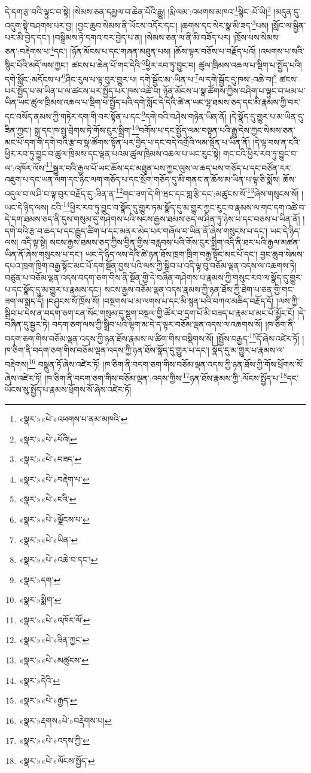 དེ་དག་རྩ་བའི་ལྟུང་བ་སྟེ། །སེམས་ཅན་དམྱལ་བ་ཆེན་པོའི་རྒྱུ། །རྨི་ལམ་:འཕགས་མཁའ་\footnote{«སྣར་»«པེ་»འཕགས་པ་ནམ་མཁའི་}སྙིང་:པོ་ཡི།\footnote{«སྣར་»«པེ་»པོའི།} །མདུན་དུ་འདུག་སྟེ་བཤགས་པར་བྱ། །བྱང་ཆུབ་སེམས་ནི་ཡོངས་འདོར་དང་། །ཆགས་དང་སེར་སྣ་མི་ཟད་\footnote{«སྣར་»«པེ་»བཟད་}པས། །སློང་ལ་སྦྱིན་པར་མི་བྱེད་དང་། །བསྒྲིམས་ཏེ་དགའ་བར་བྱེད་པ་ན། །སེམས་ཅན་ལ་ནི་མི་བཟོད་པར། །ཁྲོས་པས་སེམས་ཅན་:བརྡེགས་པ་\footnote{«སྣར་»«པེ་»བརྡེག་པ་}དང་། །ཉོན་མོངས་པ་དང་གཞན་མཐུན་པས། །ཆོས་ལྟར་བཅོས་པ་བརྗོད་པའོ། །འཕགས་པ་སའི་སྙིང་པོའི་མདོ་ལས་ཀྱང་། ཚངས་པ་ཆེན་པོ་གང་དེའི་\footnote{«སྣར་»«པེ་»ངའི་}ཕྱིར་རབ་ཏུ་བྱུང་བ། ཚུལ་ཁྲིམས་འཆལ་པ་སྡིག་པ་སྤྱོད་པའི། དགེ་སློང་:མདོངས་པ་\footnote{«སྣར་»«པེ་»ལྗོངས་པ་}ཤིང་རུལ་པ་ལྟ་བུར་གྱུར་པ། དགེ་སྦྱོང་མ་:ཡིན་པ་\footnote{«སྣར་»«པེ་»ཡིན་}ལ་དགེ་སྦྱོང་དུ་ཁས་:འཆེ་བ།\footnote{«སྣར་»«པེ་»འཆེ་བ་དང་།} ཚངས་པར་སྤྱོད་པ་མ་ཡིན་པ་ལ་ཚངས་པར་སྤྱོད་པར་ཁས་འཚེ་བ། ཉོན་མོངས་པ་སྣ་ཚོགས་ཀྱིས་བཤིག་པ་ལྟུང་བ་ཕམ་པ་ཡིན་ཡང་ཚུལ་ཁྲིམས་འཆལ་པ་སྡིག་པ་སྤྱོད་པའི་དགེ་སློང་དེ་དེའི་ཚེ་ན་ཡང་ལྷ་ཐམས་ཅད་དང་མི་རྣམས་ཀྱི་བར་དང་བསོད་ནམས་ཀྱི་གཏེར་དག་གི་བར་སྟོན་པ་དང་\footnote{«སྣར་»དག་}དགེ་བའི་བཤེས་གཉེན་ཡིན་ནོ། །དེ་སྣོད་དུ་གྱུར་པ་མ་ཡིན་དུ་ཟིན་ཀྱང་། སྐྲ་དང་ཁ་སྤུ་བྲེགས་ཏེ་གོས་ངུར་སྨྲིག་\footnote{«སྣར་»སྨིག་}བགོས་པ་དང་སྤྱོད་ལམ་བསྟན་པའི་རྒྱུ་དེས་ཀྱང་སེམས་ཅན་མང་པོ་དག་གི་དགེ་བའི་རྩ་བ་སྣ་ཚོགས་སྟོན་པར་བྱེད་པ་དང་བདེ་འགྲོའི་ལམ་སྟོན་པ་ཡིན་ནོ། །དེ་ལྟ་བས་ན་ངའི་ཕྱིར་རབ་ཏུ་བྱུང་བ་ཚུལ་ཁྲིམས་དང་ལྡན་པའམ་ཚུལ་ཁྲིམས་འཆལ་པ་ཡང་རུང་སྟེ། གང་ངའི་ཕྱིར་རབ་ཏུ་བྱུང་བ་ལ་:འཁོར་ལོས་\footnote{«སྣར་»«པེ་»འཁོར་ལོ་}སྒྱུར་བའི་རྒྱལ་པོ་ཡང་ཆོས་དང་མཐུན་པས་ཀྱང་ལུས་ལ་ཆད་པས་གཅོད་པ་དང་བཙོན་རར་འཇུག་པ་དང་ཡན་ལག་དང་ཉིང་ལག་གཅོད་པ་དང་སྲོག་གཅོད་དུ་མི་གནང་ན་ཆོས་མ་ཡིན་པ་ལྟ་ཅི་སྨོས། ཆོས་འདུལ་བ་ལ་ཤི་བ་ལྟ་བུར་བརྗོད་དུ་:ཟིན་ན་\footnote{«སྣར་»«པེ་»ཟིན་ཀྱང་}གང་ཟག་དེ་གི་ཝང་དང་གླ་རྩི་དང་:མཚུངས་སོ་\footnote{«སྣར་»«པེ་»མཚུངས་}ཞེས་གསུངས་སོ། །ཡང་དེ་ཉིད་ལས། ངའི་\footnote{«སྣར་»དེའི་}ཕྱིར་རབ་ཏུ་བྱུང་བ་སྣོད་དུ་གྱུར་ཏམ་སྣོད་དུ་མ་གྱུར་ཀྱང་རུང་བ་རྣམས་ལ་གང་དག་འཚེ་བ་དེ་དག་ཐམས་ཅད་ནི་དུས་གསུམ་དུ་གཤེགས་པའི་སངས་རྒྱས་ཐམས་ཅད་ལ་ཤིན་ཏུ་ཉེས་པ་དང་བཅས་པ་ཡིན་ནོ། །དགེ་བའི་རྩ་བ་ཆད་པ་དང་རྒྱུད་ཚིག་པ་དང་མནར་མེད་པར་གཞོལ་བ་ཡིན་ནོ་ཞེས་གསུངས་པ་དང་། ཡང་དེ་ཉིད་ལས། འདི་ལྟ་སྟེ། སངས་རྒྱས་ཐམས་ཅད་ཀྱིས་བྱིན་གྱིས་བརླབས་པའི་གོས་ངུར་སྨྲིག་འདི་ནི་ཐར་པའི་རྒྱལ་མཚན་ཡིན་ནོ་ཞེས་གསུངས་པ་དང་། ཡང་དེ་ཉིད་ལས་དེའི་ཚེ་ཉན་ཐོས་ཁྲག་ཁྲིག་བརྒྱ་སྟོང་མང་པོ་དང་། བྱང་ཆུབ་སེམས་དཔའ་ཁྲག་ཁྲིག་བརྒྱ་སྟོང་མང་པོ་དག་སྔོན་བྱས་པའི་ལས་ཀྱི་སྒྲིབ་པ་འདི་ལྟ་བུ་བཅོམ་ལྡན་འདས་ལ་འཆགས་ཏེ། བཙུན་པ་བཅོམ་ལྡན་འདས་བདག་ཅག་གིས་ནི་སྔོན་གྱི་དེ་བཞིན་གཤེགས་པ་རྣམས་ཀྱི་གསུང་རབ་ལ་སྣོད་དུ་གྱུར་པ་དང་སྣོད་དུ་མ་གྱུར་པ་རྣམས་དང་། སངས་རྒྱས་བཅོམ་ལྡན་འདས་རྣམས་ཀྱི་ཉན་ཐོས་ཀྱི་ཐེག་པ་ཅན་གྱི་གང་ཟག་ལ་སྨད་དོ། །བཤུངས་སོ་ཁྲོས་སོ། །བསྔགས་པ་མ་ལགས་པ་དང་མི་སྙན་པའི་བཀའ་མཆིད་བརྗོད་དོ། །ལས་ཀྱི་སྒྲིབ་པ་དེས་ན་བདག་ཅག་ངན་སོང་གསུམ་དུ་སྡུག་བསྔལ་གྱི་ཚོར་བ་དྲག་པོ་མི་བཟད་པ་རྣམ་པ་མང་པོ་མྱོང་ངོ། །དེ་བཞིན་དུ་སྦྱར་ཏེ། བདག་ཅག་ལས་ཀྱི་སྒྲིབ་པའི་ལྷག་མ་དེ་ད་ལྟར་བཅོམ་ལྡན་འདས་ལ་འཆགས་སོ། །ཁ་ཅིག་ནི་བདག་ཅག་གིས་བཅོམ་ལྡན་འདས་ཀྱི་ཉན་ཐོས་རྣམས་ལ་ཚིག་གིས་བསྡིགས་སོ། །སྤྱོས་བརྒྱད་\footnote{«སྣར་»«པེ་»རྒྱད་}དོ་ཞེས་འཛེར་ཏོ། །ཁ་ཅིག་ནི་བདག་ཅག་གིས་བཅོམ་ལྡན་འདས་ཀྱི་ཉན་ཐོས་སྣོད་དུ་གྱུར་པ་དང་། སྣོད་དུ་མ་གྱུར་པ་རྣམས་ལ་བརྡེགས།\footnote{«སྣར་»རྡགས«པེ་»བརྡེགས་པ།} བསྣུན་ཏོ་ཞེས་འཛེར་ཏོ། །ཁ་ཅིག་ནི་བདག་ཅག་གིས་བཅོམ་ལྡན་འདས་ཀྱི་ཉན་ཐོས་ཀྱི་གོས་ཕྲོགས་སོ་ཞེས་འཛེར་ཏོ། །ཁ་ཅིག་ནི་བདག་ཅག་གིས་བཅོམ་ལྡན་:འདས་ཀྱིས་\footnote{«སྣར་»«པེ་»འདས་ཀྱི་}ཉན་ཐོས་རྣམས་ཀྱི་:ལོངས་སྤྱོད་པ་\footnote{«སྣར་»«པེ་»ལོངས་སྤྱོད་}དང་ཡོངས་སུ་སྤྱོད་པ་རྣམས་ཕྲོགས་སོ་ཞེས་འཛེར་ཏོ། 